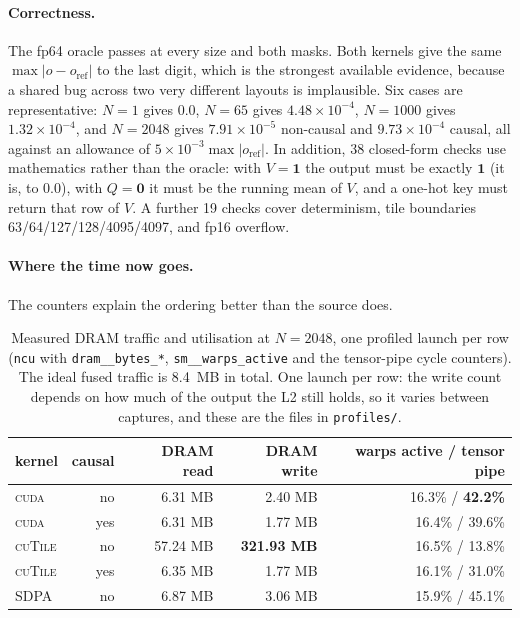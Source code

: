 \documentclass[10pt,a4paper]{article}
\newcommand{\cuda}{\textsc{cuda}}
\newcommand{\ctile}{\textsc{cuTile}}
\begin{document}
\paragraph{Correctness.} The fp64 oracle passes at every size and both masks. Both kernels give the same
$\max|o-o_{\text{ref}}|$ to the last digit, which is the strongest available evidence, because a shared
bug across two very different layouts is implausible. Six cases are representative: $N{=}1$ gives
\SI{0.0}{}, $N{=}65$ gives $4.48\times10^{-4}$, $N{=}1000$ gives $1.32\times10^{-4}$, and $N{=}2048$
gives $7.91\times10^{-5}$ non-causal and $9.73\times10^{-4}$ causal, all against an allowance of
$5\times10^{-3}\max|o_{\text{ref}}|$. In addition, 38 closed-form checks use mathematics rather than
the oracle: with $V{=}\mathbf{1}$ the output must be exactly $\mathbf{1}$ (it is, to 0.0), with
$Q{=}\mathbf{0}$ it must be the running mean of $V$, and a one-hot key must return that row of $V$. A
further 19 checks cover determinism, tile boundaries 63/64/127/128/4095/4097, and fp16 overflow.

\paragraph{Where the time now goes.} The counters explain the ordering better than the source does.

\begin{table}[H]
\centering\small
\caption{Measured DRAM traffic and utilisation at $N{=}2048$, one profiled launch per row
(\texttt{ncu} with \texttt{dram\_\_bytes\_*}, \texttt{sm\_\_warps\_active} and the tensor-pipe cycle
counters). The ideal fused traffic is \SI{8.4}{MB} in total. One launch per row: the write count
depends on how much of the output the L2 still holds, so it varies between captures, and these are the
files in \texttt{profiles/}.}
\label{tab:dram}
\begin{tabular}{@{}lrrrr@{}}
\toprule
kernel & causal & DRAM read & DRAM write & warps active / tensor pipe \\
\midrule
\cuda{} & no & 6.31 MB & 2.40 MB & 16.3\% / \textbf{42.2\%} \\
\cuda{} & yes & 6.31 MB & 1.77 MB & 16.4\% / 39.6\% \\
\ctile{} & no & 57.24 MB & \textbf{321.93 MB} & 16.5\% / 13.8\% \\
\ctile{} & yes & 6.35 MB & 1.77 MB & 16.1\% / 31.0\% \\
SDPA & no & 6.87 MB & 3.06 MB & 15.9\% / 45.1\% \\
\bottomrule
\end{tabular}
\end{table}
\end{document}
